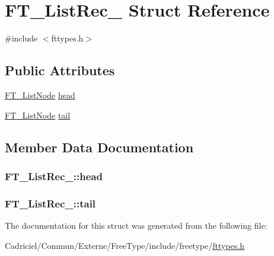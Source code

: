 \hypertarget{struct_f_t___list_rec__}{\section{F\-T\-\_\-\-List\-Rec\-\_\- Struct Reference}
\label{struct_f_t___list_rec__}
}


{\ttfamily \#include $<$fttypes.\-h$>$}

\subsection*{Public Attributes}
\begin{DoxyCompactItemize}
\item 
\hyperlink{fttypes_8h_a155e4980a42c16fbc221ad40b2b59695}{F\-T\-\_\-\-List\-Node} \hyperlink{struct_f_t___list_rec___a09ed35c2bcdc1c3acd12ff4650dfdeb9}{head}
\item 
\hyperlink{fttypes_8h_a155e4980a42c16fbc221ad40b2b59695}{F\-T\-\_\-\-List\-Node} \hyperlink{struct_f_t___list_rec___a4664761f0ab2af3d48231b00cd978b23}{tail}
\end{DoxyCompactItemize}


\subsection{Member Data Documentation}
\hypertarget{struct_f_t___list_rec___a09ed35c2bcdc1c3acd12ff4650dfdeb9}{
\subsubsection[{head}]{ F\-T\-\_\-\-List\-Rec\-\_\-\-::head}}\label{struct_f_t___list_rec___a09ed35c2bcdc1c3acd12ff4650dfdeb9}
\hypertarget{struct_f_t___list_rec___a4664761f0ab2af3d48231b00cd978b23}{
\subsubsection[{tail}]{ F\-T\-\_\-\-List\-Rec\-\_\-\-::tail}}\label{struct_f_t___list_rec___a4664761f0ab2af3d48231b00cd978b23}


The documentation for this struct was generated from the following file\-:\begin{DoxyCompactItemize}
\item 
Cadriciel/\-Commun/\-Externe/\-Free\-Type/include/freetype/\hyperlink{fttypes_8h}{fttypes.\-h}\end{DoxyCompactItemize}

